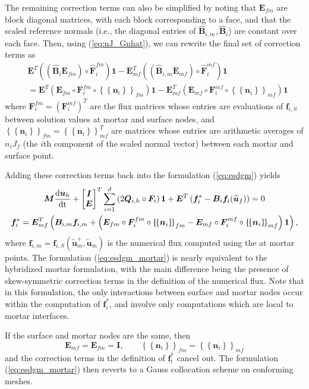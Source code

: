 \documentclass{svjour3}                     %
\renewcommand{\hat}{\widehat}
\renewcommand{\tilde}{\widetilde}
\newcommand{\td}[2]{\frac{{\rm d}#1}{{\rm d}{\rm #2}}}
\newcommand{\LRp}[1]{\left( #1 \right)}
\newcommand{\LRc}[1]{\left\{ #1 \right\}}
\newcommand{\avg}[1] {\ensuremath{\LRc{\!\LRc{#1}\!}}}
\begin{document}
The remaining correction terms can also be simplified by noting that $\bm{E}_{fm}$ are block diagonal matrices, with each block corresponding to a face, and that the scaled reference normals (i.e., the diagonal entries of $\hat{\bm{B}}_{i,m}, \hat{\bm{B}}_{i}$) are constant over each face.  
Then, using (\ref{eq:nJ_Gnhat}), we can rewrite the final set of correction terms as
\begin{align*}
&\bm{E}^T \LRp{\LRp{\hat{\bm{B}}_i\bm{E}_{fm}}\circ \hat{\bm{F}}_i^{fm}}\bm{1} - \bm{E}_{mf}^T \LRp{ \LRp{\hat{\bm{B}}_{i,m}\bm{E}_{mf}} \circ \hat{\bm{F}}_i^{mf}}\bm{1}\\
& = \bm{E}^T \LRp{{\bm{E}_{fm}}\circ \bm{F}_i^{fm} \circ \avg{\bm{n}_i}_{fm}}\bm{1} - \bm{E}_{mf}^T \LRp{ {\bm{E}_{mf}} \circ {\bm{F}}_i^{mf} \circ \avg{\bm{n}_i}_{mf}}\bm{1}
\end{align*}
where $\bm{F}_i^{fm} = \LRp{\bm{F}_i^{mf}}^T$ are the flux matrices whose entries are evaluations of $\bm{f}_{i,S}$ between solution values at mortar and surface nodes, and $\avg{\bm{n}_i}_{fm} = \avg{\bm{n}_i}_{mf}^T$ are matrices whose entries are arithmetic averages of $n_iJ_f$ (the $i$th component of the scaled normal vector) between each mortar and surface point.

Adding these correction terms back into the formulation (\ref{eq:esdgm}) yields 
\begin{gather}
{\bm{M}}\td{\bm{u}_h}{t} + \begin{bmatrix} \bm{I} \\ \bm{E} \end{bmatrix}^T
\sum_{i=1}^d \LRp{2{\bm{Q}}_{i,h} \circ \bm{F}_i}\bm{1} + \bm{E}^T\LRp{\bm{f}_i^*- \bm{B}_i\bm{f}_i(\tilde{\bm{u}}_f)} = 0 \label{eq:esdgm_mortar}\\
\bm{f}_i^* = \bm{E}_{mf}^T\LRp{{\bm{B}}_{i,m}\bm{f}_{i,m} + \LRp{{\bm{E}_{fm}}\circ \bm{F}_i^{fm} \circ \avg{\bm{n}_i}_{fm} - {\bm{E}_{mf}} \circ {\bm{F}}_i^{mf} \circ \avg{\bm{n}_i}_{mf}}\bm{1}},\nonumber
\end{gather}
where $\bm{f}_{i,m} = \bm{f}_{i,S}(\tilde{\bm{u}}_m^+,\tilde{\bm{u}}_m)$ is the numerical flux computed using the  at mortar points.  The formulation (\ref{eq:esdgm_mortar}) is nearly equivalent to the hybridized mortar formulation, with the main difference being the presence of skew-symmetric correction terms in the definition of the numerical flux.  Note that in this formulation, the only interactions between surface and mortar nodes occur within the computation of $\bm{f}^*_i$, and involve only computations which are local to mortar interfaces.  
\begin{remark}
If the surface and mortar nodes are the same, then 
\[
\bm{E}_{mf} = \bm{E}_{fm} = \bm{I}, \qquad \avg{\bm{n}_i}_{fm} = \avg{\bm{n}_i}_{mf}
\]
and the correction terms in the definition of $\bm{f}^*_i$ cancel out.  The formulation (\ref{eq:esdgm_mortar}) then reverts to a Gauss collocation scheme \cite{chan2017discretely} on conforming meshes.  
\end{remark}
\end{document}
